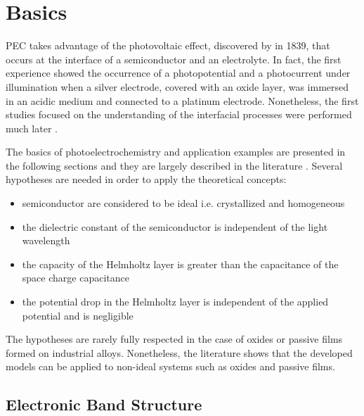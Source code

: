 \section{Basics}\label{sec_basics}

    PEC takes advantage of the photovoltaic effect, discovered by 
    \citet{becquerel1839} in 1839, that occurs at the interface of a semiconductor
    and an electrolyte. 
    In fact, the first experience showed the occurrence of a photopotential and 
    a photocurrent under illumination when a silver electrode, 
    covered with an oxide layer, was immersed in an acidic medium and connected 
    to a platinum electrode. 
    Nonetheless, the first studies focused on the understanding of the interfacial 
    processes were performed much later 
    \citep{stimming1986,gerischer1966,copeland1942}.

    The basics of photoelectrochemistry and application examples are presented in 
    the following sections and they are largely described in the literature 
    \citep{morrison1980,gerischer1985,memming2008,marcus2006,bard2002,sato1998}. 
    Several hypotheses are needed in order to apply the theoretical concepts:  
    \begin{itemize}
        \item semiconductor are considered to be ideal i.e. crystallized and homogeneous  
        \item the dielectric constant of the semiconductor is independent of the light wavelength  
        \item the capacity of the Helmholtz layer is greater than the capacitance of the space charge capacitance  
        \item the potential drop in the Helmholtz layer is independent of the applied potential and is negligible
    \end{itemize}

    The hypotheses are rarely fully respected in the case of oxides or passive 
    films formed on industrial alloys. Nonetheless, the literature shows that the 
    developed models can be applied to non-ideal systems such as oxides 
    and passive films.


\subsection{Electronic Band Structure}

